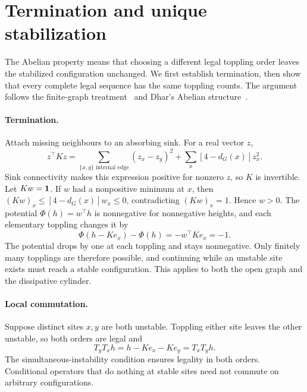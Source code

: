 \section{Termination and unique stabilization}\label{sec:abelian}
The Abelian property means that choosing a different legal toppling order leaves the stabilized configuration unchanged. We first establish termination, then show that every complete legal sequence has the same toppling counts. The argument follows the finite-graph treatment~\cite[Theorem 2.3 and Exercise 2.6]{jarai2018} and Dhar's Abelian structure~\cite{dhar1990}.

\paragraph{Termination.}
Attach missing neighbours to an absorbing sink. For a real vector $z$,
\begin{equation}
 z^\top Kz=\sum_{\{x,y\}\text{ internal edge}}(z_x-z_y)^2+
               \sum_x[4-d_G(x)]z_x^2.
\end{equation}
Sink connectivity makes this expression positive for nonzero $z$, so $K$ is invertible. Let $Kw=\mathbf 1$. If $w$ had a nonpositive minimum at $x$, then $(Kw)_x\leq[4-d_G(x)]w_x\leq0$, contradicting $(Kw)_x=1$. Hence $w>0$. The potential $\Phi(h)=w^\top h$ is nonnegative for nonnegative heights, and each elementary toppling changes it by
\begin{equation}
 \Phi(h-Ke_x)-\Phi(h)=-w^\top Ke_x=-1.
\end{equation}
The potential drops by one at each toppling and stays nonnegative. Only finitely many topplings are therefore possible, and continuing while an unstable site exists must reach a stable configuration. This applies to both the open graph and the dissipative cylinder.

\paragraph{Local commutation.}
Suppose distinct sites $x,y$ are both unstable. Toppling either site leaves the other unstable, so both orders are legal and
\begin{equation}
 T_yT_xh=h-Ke_x-Ke_y=T_xT_yh.
\end{equation}
The simultaneous-instability condition ensures legality in both orders. Conditional operators that do nothing at stable sites need not commute on arbitrary configurations.

